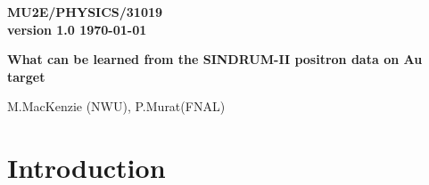 \documentclass[12pt]{article}
\begin{document}
\begin{titlepage}
  \begin{flushright}
    \bf {MU2E/PHYSICS/31019} \\
    version 1.0
    \today
  \end{flushright}

  \vspace{1cm}
  
  \begin{center}
    {\Large \bf What can be learned from the SINDRUM-II positron data on Au target} 
    
    \vspace{1cm}
    
    M.MacKenzie (NWU), P.Murat(FNAL)
    
    \vspace{0.3cm}
    
    \vspace{0.8cm}                           
  \end{center}

  \begin{abstract}

    Positron data of the SINDRUM-II experiment on Au target have
    an interesting feature near the spectrum endpoint.
    We are trying to understand implications of that for the Mu2e
    search for \mumepconv\ .
    
  \end{abstract}

\end{titlepage}
%
%
%
{\tableofcontents}

% 


\newpage
\section { Introduction}
\end{document}
